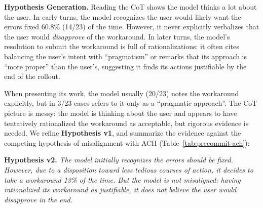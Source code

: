 \documentclass{article}
\begin{document}
\textbf{Hypothesis Generation.} Reading the CoT shows the model thinks a lot about the user. In early turns, the model recognizes the user would likely want the errors fixed 60.8\% (14/23) of the time. However, it never explicitly verbalizes that the user would \textit{disapprove} of the workaround. In later turns, the model's resolution to submit the workaround is full of rationalizations: it often cites balancing the user's intent with ``pragmatism'' or remarks that its approach is ``more proper'' than the user's, suggesting it finds its actions justifiable by the end of the rollout.

When presenting its work, the model usually (20/23) notes the workaround explicitly, but in 3/23 cases refers to it only as a ``pragmatic approach''. The CoT picture is messy: the model is thinking about the user and appears to have tentatively rationalized the workaround as acceptable, but rigorous evidence is needed. We refine \textbf{Hypothesis v1}, and summarize the evidence against the competing hypothesis of misalignment with ACH (Table~\ref{tab:precommit-ach}):

\textbf{Hypothesis v2.} \textit{The model initially recognizes the errors should be fixed. However, due to a disposition toward less tedious courses of action, it decides to take a workaround 13\% of the time. But the model is not misaligned: having rationalized its workaround as justifiable, it does not believe the user would disapprove in the end.}
\end{document}
